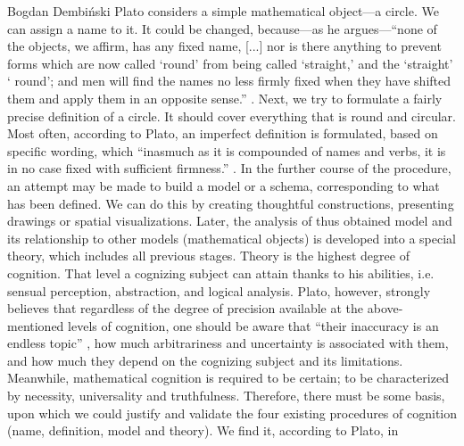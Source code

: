 \begin{artengenv}{Bogdan Dembiński}
Plato considers a simple mathematical object---a circle. We can assign a name to it. It could be changed, because---as he
argues---``none of the objects, we affirm, has any fixed name, [...] nor is there anything to prevent forms which are now
called ‘round’ from being called ‘straight,’ and the ‘straight’ ‘%
round’; and men will find the names no less firmly fixed when they have shifted them and apply them in an opposite
sense.''
\parencite[\textit{Letters}, 343b]{plato_platonis_1955}.
Next, we try to formulate a fairly precise definition
of a circle. It should cover everything that is round and circular. Most often, according to Plato, an imperfect
definition is formulated, based on specific wording, which ``inasmuch as it is compounded of names and verbs, it is in
no case fixed with sufficient firmness.''
\parencite[\textit{Letters}, 343b]{plato_platonis_1955}.
In the further course
of the procedure, an attempt may be made to build a model or a schema, corresponding to what has been defined. We can
do this by creating thoughtful constructions, presenting drawings or spatial visualizations. Later, the analysis of
thus obtained model and its relationship to other models (mathematical objects) is developed into a special theory,
which includes all previous stages. Theory is the highest degree of cognition.  That level a cognizing subject can
attain thanks to his abilities, i.e. sensual perception, abstraction, and logical analysis. Plato, however, strongly
believes that regardless of the degree of precision available at the above-mentioned levels of cognition, one should be
aware that ``their inaccuracy is an endless topic''
\parencite[\textit{Letters}, 343b]{plato_platonis_1955},
how much
arbitrariness and uncertainty is associated with them, and how much they depend on the cognizing subject and its
limitations. Meanwhile, mathematical cognition is required to be certain; to be characterized by necessity,
universality and truthfulness. Therefore, there must be some basis, upon which we could justify and validate the four
existing procedures of cognition (name, definition, model and theory). We find it, according to Plato, in%

\end{artengenv}
